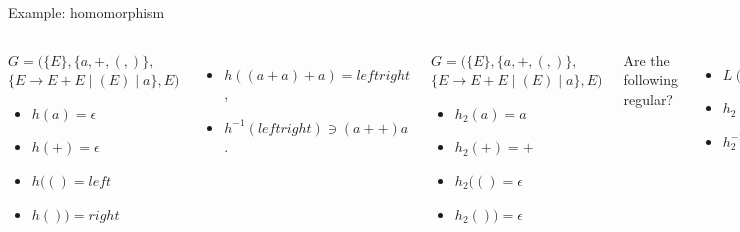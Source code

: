 \documentclass[handout]{beamer}
\begin{document}
  
\begin{frame}{Example: homomorphism}
        
    \begin{columns}

    
        \begin{example}
            $G=(\{E\},\{a,+,(,)\},$ $\{E\rightarrow E+E\mid (E)\mid a\},E)$        
            \begin{itemize}            
                \item $h(a)=\epsilon$
                \item $h(+)=\epsilon$
                \item $h(()=left$
                \item $h())=right$               
            \end{itemize}
        \end{example}
        \begin{itemize}
            \item $h((a+a)+a)=leftright $,
            \item $h^{-1}(leftright)\ni (a++)a$.
        \end{itemize}

        \vspace{1.75cm}
    

        \begin{example}
            $G=(\{E\},\{a,+,(,)\},$ $\{E\rightarrow E+E\mid (E)\mid a\},E)$
            \begin{itemize}
                \item $h_2(a)=a$
                \item $h_2(+)=+$
                \item $h_2(()=\epsilon$
                \item $h_2())=\epsilon$
            \end{itemize}
        \end{example}
        Are the following regular?
        \begin{itemize}
            \item $L(G)$
            \item $h_2(L(G))$
            \item $h_2^{-1}(h_2(L(G)))$
        \end{itemize}
        Is $h_2^{-1}(h_2(L(G)))=L(G)$?       
        
    \end{columns}
            
\end{frame}
\end{document}
